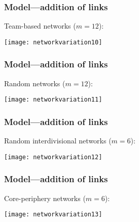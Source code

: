 
\begin{frame}
  \frametitle{Model---addition of links}

  \begin{block}{Team-based networks ($m=12$):}
    \begin{center}
      \texttt{[image: networkvariation10]}
    \end{center}
  \end{block}
    
\end{frame}

\begin{frame}
  \frametitle{Model---addition of links}

  \begin{block}{Random networks ($m=12$):}
    \begin{center}
      \texttt{[image: networkvariation11]}
    \end{center}
  \end{block}

\end{frame}

\begin{frame}
  \frametitle{Model---addition of links}

  \begin{block}{Random interdivisional networks ($m=6$):}
    \begin{center}
      \texttt{[image: networkvariation12]}
    \end{center}
  \end{block}

\end{frame}

\begin{frame}
  \frametitle{Model---addition of links}

  \begin{block}{Core-periphery networks ($m=6$):}
    \begin{center}
      \texttt{[image: networkvariation13]}
    \end{center}
  \end{block}

\end{frame}

